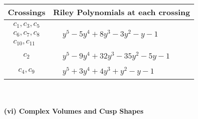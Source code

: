\documentclass[1p]{elsarticle_modified}
\theoremstyle{definition}
\begin{document}
\begin{tabular}{m{50pt}|m{274pt}}
Crossings & \hspace{64pt}Riley Polynomials at each crossing \\
\hline $$\begin{aligned}c_{1},c_{3},c_{5}\\c_{6},c_{7},c_{8}\\c_{10},c_{11}\end{aligned}$$&$\begin{aligned}
&y^5-5 y^4+8 y^3-3 y^2- y-1
\end{aligned}$\\
\hline $$\begin{aligned}c_{2}\end{aligned}$$&$\begin{aligned}
&y^5-9 y^4+32 y^3-35 y^2-5 y-1
\end{aligned}$\\
\hline $$\begin{aligned}c_{4},c_{9}\end{aligned}$$&$\begin{aligned}
&y^5+3 y^4+4 y^3+y^2- y-1
\end{aligned}$\\
\hline
\end{tabular}\\~\\
\newpage\flushleft \textbf{(vi) Complex Volumes and Cusp Shapes}
\end{document}
